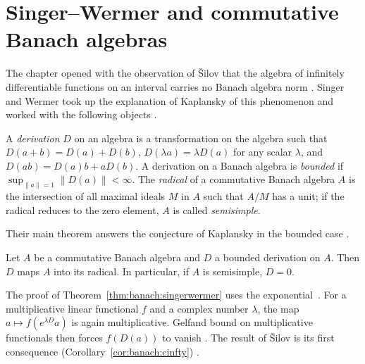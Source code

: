 \section{Singer--Wermer and commutative Banach algebras}\label{sec:banach-operator:singer-wermer}

The chapter opened with the observation of \v{S}ilov that the algebra of
infinitely differentiable functions on an interval carries no Banach
algebra norm \cite[p.~260]{SingerWermer1955}. Singer and Wermer took up
the explanation of Kaplansky of this phenomenon and worked with the following
objects \cite[p.~260]{SingerWermer1955}.

\begin{definition}\label{def:banach:derivation}
A \emph{derivation} $D$ on an algebra is a transformation on the algebra
such that $D(a+b)=D(a)+D(b)$, $D(\lambda a)=\lambda D(a)$ for any scalar
$\lambda$, and $D(ab)=D(a)b+aD(b)$. A derivation on a Banach algebra is
\emph{bounded} if $\sup_{\|a\|=1}\|D(a)\|<\infty$. The \emph{radical} of a
commutative Banach algebra $A$ is the intersection of all maximal ideals
$M$ in $A$ such that $A/M$ has a unit; if the radical reduces to the zero
element, $A$ is called \emph{semisimple}.
\end{definition}

Their main theorem answers the conjecture of Kaplansky in the bounded case
\cite[p.~260]{SingerWermer1955}.

\begin{theorem}\label{thm:banach:singerwermer}
Let $A$ be a commutative Banach algebra and $D$ a bounded derivation on
$A$. Then $D$ maps $A$ into its radical. In particular, if $A$ is
semisimple, $D=0$.
\end{theorem}

The proof of Theorem~\ref{thm:banach:singerwermer} uses the exponential~\cite[p.~260]{SingerWermer1955}. For a
multiplicative linear functional $f$ and a complex number $\lambda$, the map
$a\mapsto f(e^{\lambda D}a)$ is again multiplicative. Gelfand bound on
multiplicative functionals then forces $f(D(a))$ to vanish
\cite[p.~260]{SingerWermer1955}. The result of \v{S}ilov is its first
consequence (Corollary~\ref{cor:banach:cinfty})
\cite[p.~260]{SingerWermer1955}.

